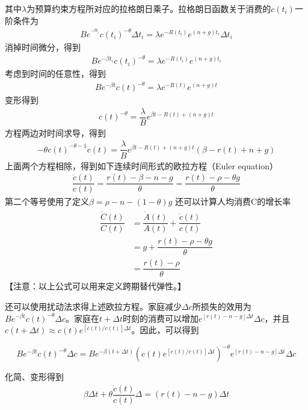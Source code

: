 其中$ \lambda $为预算约束方程所对应的拉格朗日乘子。拉格朗日函数关于消费的$ c(t_i) $一阶条件为
\begin{gather}
	Be^{^{-\beta t_i}}c(t_i)^{-\theta}\Delta t_i=\lambda e^{-R(t_i)}
	e^{(n+g)t_i}\Delta t_i
\end{gather}
消掉时间微分，得到
\begin{gather}
	Be^{-\beta t_i}c(t_i)^{-\theta}=\lambda e^{-R(t_i)}e^{(n+g)t_i}
\end{gather}
考虑到时间的任意性，得到
\begin{gather}
	Be^{-\beta t}c(t)^{-\theta}=\lambda e^{-R(t)}e^{(n+g)t}
\end{gather}
变形得到
\begin{gather}
	c(t)^{-\theta}=\dfrac{\lambda}{B}e^{\beta t-R(t)+(n+g)t}
\end{gather}
方程两边对时间求导，得到
\begin{gather}
	-\theta c(t)^{-\theta-1}\dot{c}(t)=\dfrac{\lambda}{B}e^{\beta t-R(t)+(n+g)t}(\beta-r(t)+n+g)
\end{gather}
上面两个方程相除，得到如下连续时间形式的欧拉方程（Euler equation）
\begin{align}
  \dfrac{\dot{c}(t)}{c(t)}=\dfrac{r(t)-\beta -n-g}{\theta}=\dfrac{r(t)-\rho-\theta g}{\theta}
\end{align}
第二个等号使用了定义$ \beta =\rho-n-(1-\theta) g $
还可以计算人均消费C的增长率
\begin{align}
\begin{split}
\dfrac{\dot {C}(t)}{C(t)}&=\dfrac{\dot{A}(t)}{A(t)}+\dfrac{\dot{c}(t)}{c(t)}
\\
&=g+\dfrac{r(t)-\rho-\theta g}{\theta}
\\
&=\dfrac{r(t)-\rho}{\theta}
\end{split}	
\end{align}
【注意：以上公式可以用来定义跨期替代弹性。】

还可以使用扰动法求得上述欧拉方程。家庭减少$ \Delta c $所损失的效用为$ Be^{-\beta t}c(t)^{-\theta}\Delta c $。家庭在$ t+\Delta t $时刻的消费可以增加$ e^{[r(t)-n-g]\Delta t}\Delta c $，并且
$ c(t+\Delta t) \approx c(t) e^{[\dot{c}(t)/c(t)]\Delta t}$。因此，可以得到

\[Be^{-\beta t}c(t)^{-\theta}\Delta c =Be^{-\beta (t+\Delta t)}\left(c(t)e^{[\dot{c}(t)/c(t)]\Delta t}\right)^{-\theta}e^{[r(t)-n-g]\Delta t} \Delta c\]


化简、变形得到
\begin{gather}
	\beta \Delta t+\theta\dfrac{\dot{c}(t)}{c(t)}\Delta=
	\left(r(t)-n-g
	\right)\Delta t
\end{gather}

